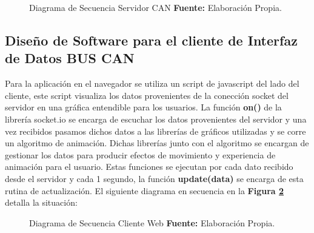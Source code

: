 
\begin{figure}[t]
	\centering
	\begin{center}
		
	\end{center}
	\caption[Diagrama de Secuencia Servidor CAN.]{Diagrama de Secuencia Servidor CAN \textbf{Fuente:} Elaboración Propia.}
	\label{snode} %
\end{figure}





\subsection{Diseño de Software para el cliente de Interfaz de Datos BUS CAN}


Para la aplicación en el navegador se utiliza un script de  javascript del lado del cliente, este script visualiza los datos provenientes de la conección socket del servidor en una gráfica entendible para los usuarios. 
La función {\bfseries on()} de la librería socket.io se encarga de escuchar los datos provenientes del servidor y una vez recibidos pasamos dichos datos a las librerías de gráficos utilizadas y se corre un algoritmo de animación. 
Dichas librerías junto con el algoritmo se encargan de gestionar los datos para producir efectos de movimiento y experiencia de animación para el usuario. 
Estas funciones se ejecutan por cada dato recibido desde el servidor y cada 1 segundo, la función {\bfseries update(data)} se encarga de esta rutina de actualización. 
El siguiente diagrama en secuencia en la \textbf{Figura \ref{cweb}} detalla la situación: 

\begin{figure}[H]
	\centering
	\begin{center}
		
	\end{center}
	\caption[Diagrama de Secuencia Cliente Web.]{Diagrama de Secuencia Cliente Web \textbf{ Fuente:} Elaboración Propia.}
	\label{cweb} %
\end{figure}

	


